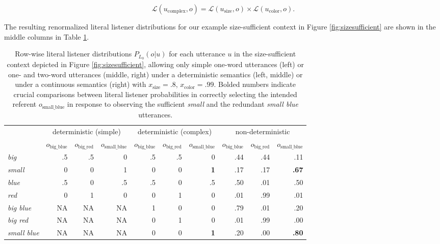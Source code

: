 \documentclass[11pt]{article}
\newcommand{\tableref}[1]{Table \ref{#1}}
\newcommand{\figref}[1]{Figure \ref{#1}}
\begin{document}
\begin{equation} 
\label{eq:prodcomp}
\mathcal{L}(u_{\text{complex}},o) = \mathcal{L}(u_{\text{size}},o) \times \mathcal{L}(u_{\text{color}},o).
\end{equation} 

The resulting renormalized literal listener distributions for our example size-sufficient context in \figref{fig:sizesufficient} are shown in the middle columns in \tableref{tab:detliteral}. 

\begin{table}
\caption{Row-wise literal listener distributions $P_{L_0}(o | u)$ for each utterance $u$ in the size-sufficient context depicted in \figref{fig:sizesufficient}, allowing only simple one-word utterances (left) or one- and two-word utterances (middle, right) under a deterministic semantics (left, middle) or under a continuous semantics (right) with  $x_{\text{size}} = .8$, $x_{\text{color}} = .99$. Bolded numbers indicate crucial comparisons between literal listener probabilities in correctly selecting the intended referent $o_{\text{small\_blue}}$ in response to observing the sufficient \emph{small} and the redundant \emph{small blue} utterances.}
\small
\begin{tabular}{l r r r r r r r r r}
\toprule
& \multicolumn{3}{c}{deterministic (simple)} & \multicolumn{3}{c}{deterministic (complex)} & \multicolumn{3}{c}{non-deterministic}\\
& $o_{\textrm{big\_blue}}$ & $o_{\textrm{big\_red}}$ & $o_{\textrm{small\_blue}}$ & $o_{\textrm{big\_blue}}$ & $o_{\textrm{big\_red}}$ & $o_{\textrm{small\_blue}}$
& $o_{\textrm{big\_blue}}$ & $o_{\textrm{big\_red}}$ & $o_{\textrm{small\_blue}}$ \\
\midrule
\emph{big} & .5 & .5 & 0 & .5 & .5 & 0 & .44 & .44 & .11 \\
\emph{small} & 0 & 0 & 1 & 0 & 0 & \textbf{1} & .17 & .17 & \textbf{.67} \\
\emph{blue} & .5 & 0 & .5 & .5 & 0 & .5 & .50 & .01 & .50 \\
\emph{red} & 0 & 1 & 0 & 0 & 1 & 0 & .01 & .99 & .01 \\
\emph{big blue} & NA & NA & NA & 1 & 0 & 0 & .79 & .01 & .20 \\
\emph{big red} & NA & NA & NA & 0 & 1 & 0 & .01 & .99 & .00 \\
\emph{small blue} & NA & NA & NA & 0 & 0 & \textbf{1} & .20 & .00 & \textbf{.80} \\
\bottomrule
\end{tabular}
\label{tab:detliteral}
\end{table}
\end{document}
